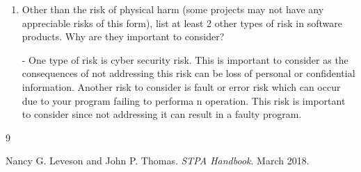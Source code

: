 \documentclass{article}
\begin{document}
\begin{enumerate}
    \item Other than the risk of physical harm (some projects may not have any
    appreciable risks of this form), list at least 2 other types of risk in
    software products. Why are they important to consider?

    - One type of risk is cyber security risk. This is important to consider as the consequences of not addressing this risk can be loss of personal or confidential information. Another risk to consider is fault or error risk which can occur due to your program failing to performa n operation. This risk is important to consider since not addressing it can result in a faulty program.
\end{enumerate}

\begin{thebibliography}{9}

    Nancy G. Leveson and John P. Thomas. 
    \textit{STPA Handbook}. 
    March 2018.
    
    \end{thebibliography}
\end{document}
